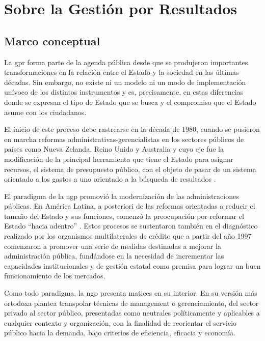 \newpage
\section{Sobre la Gestión por Resultados} \label{gpr}
\subsection{Marco conceptual}

La \ac{gpr} forma parte de la agenda pública desde que se produjeron importantes transformaciones en la relación entre el Estado y la sociedad en las últimas décadas. Sin embargo, no existe ni un modelo ni un modo de implementación unívoco de los distintos instrumentos y es, precisamente, en estas diferencias donde se expresan el tipo de Estado que se busca y el compromiso que el Estado asume con los ciudadanos.

El inicio de este proceso debe rastrearse en la década de 1980, cuando se pusieron en marcha reformas administrativas-gerencialistas en los sectores públicos de países como Nueva Zelanda, Reino Unido y Australia y cuyo eje fue la modificación de la principal herramienta que tiene el Estado para asignar recursos, el sistema de presupuesto público, con el objeto de pasar de un sistema orientado a los gastos a uno orientado a la búsqueda de resultados \parencite{arellano1999}.

El paradigma de la \ac{ngp} promovió la modernización de las administraciones públicas. En América Latina, a posteriori de las reformas orientadas a reducir el tamaño del Estado y sus funciones, comenzó la preocupación por reformar el Estado ``hacia adentro'' \parencite{oszlako1999}. Estos procesos se sustentaron también en el diagnóstico realizado por los organismos multilaterales de crédito que a partir del año 1997 comenzaron a promover una serie de medidas destinadas a mejorar la administración pública, fundándose en la necesidad de incrementar las capacidades institucionales y de gestión estatal como premisa para lograr un buen funcionamiento de los mercados.

Como todo paradigma, la \ac{ngp} presenta matices en su interior. En su versión más ortodoxa plantea transpolar técnicas de management o gerenciamiento, del sector privado al sector público, presentadas como neutrales políticamente y aplicables a cualquier contexto y organización, con la finalidad de reorientar el servicio público hacia la demanda, bajo criterios de eficiencia, eficacia y economía.

